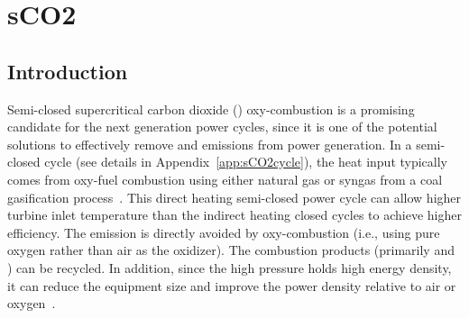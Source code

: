 \chapter{sCO2}
\label{sCO2_chapter}


\section{Introduction}
Semi-closed supercritical carbon dioxide () oxy-combustion is a promising candidate for the next generation power cycles, since it is one of the potential solutions to effectively remove  and  emissions from power generation. %
In a semi-closed  cycle (see details in Appendix~\ref{app:sCO2cycle}), the heat input typically comes from oxy-fuel combustion using either natural gas or syngas from a coal gasification process~\citep{mcclung2015comparison}. This direct heating semi-closed  power cycle can allow higher turbine inlet temperature than the indirect heating closed  cycles to achieve higher efficiency. %
The  emission is directly avoided by oxy-combustion (i.e., using pure oxygen rather than air as the oxidizer). The combustion products (primarily  and ) can be recycled. %
In addition, since the high pressure  holds high energy density, it can reduce the equipment size and improve the power density relative to air or oxygen~\citep{dostal2004supercritical,ahn2015review}. %
